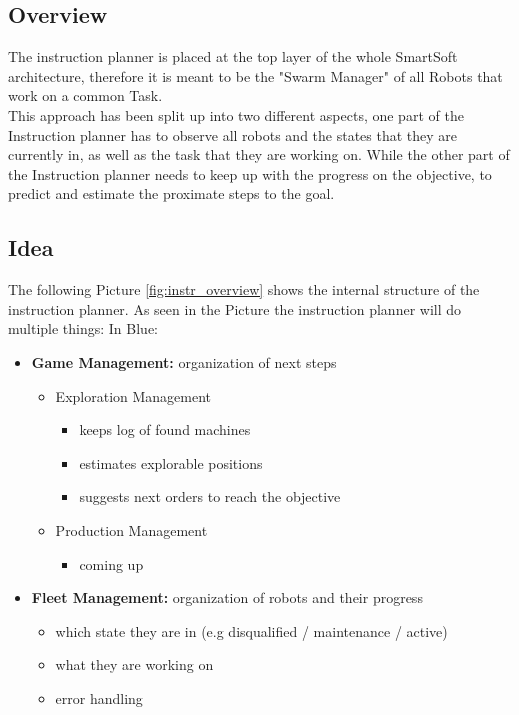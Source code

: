 

\subsection{Overview}
The instruction planner is placed at the top layer of the whole SmartSoft architecture,
therefore it is meant to be the "Swarm Manager" of all Robots that work on a common Task. \\
This approach has been split up into two different aspects, one part of the Instruction planner has to
observe all robots and the states that they are currently in, as well as the task that they are working on.
While the other part of the Instruction planner needs to keep up with the progress on the objective, to
predict and estimate the proximate steps to the goal.

\subsection{Idea}

The following Picture \ref{fig:instr_overview} shows the internal structure of the
instruction planner.
As seen in the Picture the instruction planner will do multiple things: \newpage
In Blue:\\
\begin{itemize}
    \item \textbf{Game Management:}  organization of next steps
    \begin{itemize}
        \item Exploration Management
            \begin{itemize}
                \item keeps log of found machines
                \item estimates explorable positions
                \item suggests next orders to reach the objective
            \end{itemize}
        \item Production Management
        \begin{itemize}
            \item coming up
        \end{itemize}
    \end{itemize}
    \item \textbf{Fleet Management:} organization of robots and their progress
    \begin{itemize}
        \item which state they are in (e.g disqualified / maintenance / active)
        \item what they are working on
        \item error handling
    \end{itemize}
\end{itemize}


